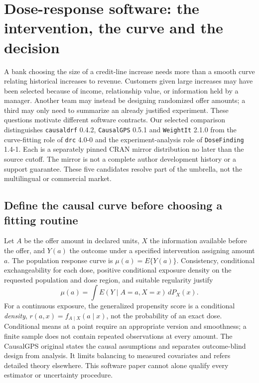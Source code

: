 \section{Dose-response software: the intervention, the curve and the decision}
\label{sec:exec24-dose-response-reuse}

A bank choosing the size of a credit-line increase needs more than a smooth
curve relating historical increases to revenue. Customers given large increases
may have been selected because of income, relationship value, or information
held by a manager. Another team may instead be designing randomized offer
amounts; a third may only need to summarize an already justified experiment.
These questions motivate different software contracts. Our selected comparison
distinguishes \texttt{causaldrf} 0.4.2, \texttt{CausalGPS} 0.5.1 and
\texttt{WeightIt} 2.1.0 from the curve-fitting role of \texttt{drc} 4.0-0 and
the experiment-analysis role of \texttt{DoseFinding} 1.4-1. Each is a separately
pinned CRAN mirror distribution no later than the source cutoff. The mirror is
not a complete author development history or a support guarantee. These five
candidates resolve part of the umbrella, not the multilingual or commercial
market.\citep{exec24_dose_causaldrf,exec24_dose_causalgps,exec24_dose_weightit,exec24_dose_drc,exec24_dose_dosefinding}

\subsection{Define the causal curve before choosing a fitting routine}
Let $A$ be the offer amount in declared units, $X$ the information available
before the offer, and $Y(a)$ the outcome under a specified intervention assigning
amount $a$. The population response curve is $\mu(a)=E\{Y(a)\}$. Consistency,
conditional exchangeability for each dose, positive conditional exposure density
on the requested population and dose region, and suitable regularity justify
\[
 \mu(a)=\int E(Y\mid A=a,X=x)\,dP_X(x).
\]
For a continuous exposure, the generalized propensity score is a conditional
\emph{density}, $r(a,x)=f_{A\mid X}(a\mid x)$, not the probability of an exact
dose. Conditional means at a point require an appropriate version and
smoothness; a finite sample does not contain repeated observations at every
amount. The CausalGPS original states the causal assumptions and separates
outcome-blind design from analysis. It limits balancing to measured covariates
and refers detailed theory elsewhere. This software paper cannot alone qualify
every estimator or uncertainty procedure.\citep{exec24_dose_original}

